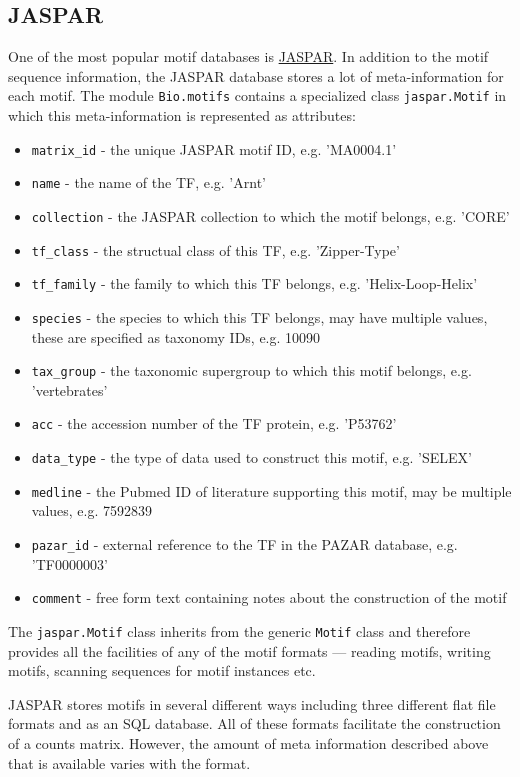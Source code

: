 \subsection{JASPAR}
One of the most popular motif databases is \href{http://jaspar.genereg.net}{JASPAR}. In addition to the motif sequence information, the JASPAR database stores a lot of meta-information for each motif. The module \verb+Bio.motifs+ contains a specialized class \verb+jaspar.Motif+ in which this meta-information is represented as attributes:
\begin{itemize}
    \item \verb+matrix_id+ - the unique JASPAR motif ID, e.g. 'MA0004.1'
    \item \verb+name+ - the name of the TF, e.g. 'Arnt'
    \item \verb+collection+ - the JASPAR collection to which the motif belongs, e.g. 'CORE'
    \item \verb+tf_class+ - the structual class of this TF, e.g. 'Zipper-Type'
    \item \verb+tf_family+ - the family to which this TF belongs, e.g. 'Helix-Loop-Helix'
    \item \verb+species+ - the species to which this TF belongs, may have multiple values, these are specified as taxonomy IDs, e.g. 10090
    \item \verb+tax_group+ - the taxonomic supergroup to which this motif belongs, e.g. 'vertebrates'
    \item \verb+acc+ - the accession number of the TF protein, e.g. 'P53762'
    \item \verb+data_type+ - the type of data used to construct this motif, e.g. 'SELEX'
    \item \verb+medline+ - the Pubmed ID of literature supporting this motif, may be multiple values, e.g. 7592839
    \item \verb+pazar_id+ - external reference to the TF in the PAZAR database, e.g. 'TF0000003'
    \item \verb+comment+ - free form text containing notes about the construction of the motif
\end{itemize}

The \verb+jaspar.Motif+ class inherits from the generic \verb+Motif+ class and therefore provides all the facilities of any of the motif formats --- reading motifs, writing motifs, scanning sequences for motif instances etc.

JASPAR stores motifs in several different ways including three different flat file formats and as an SQL database. All of these formats facilitate the construction of a counts matrix. However, the amount of meta information described above that is available varies with the format.

